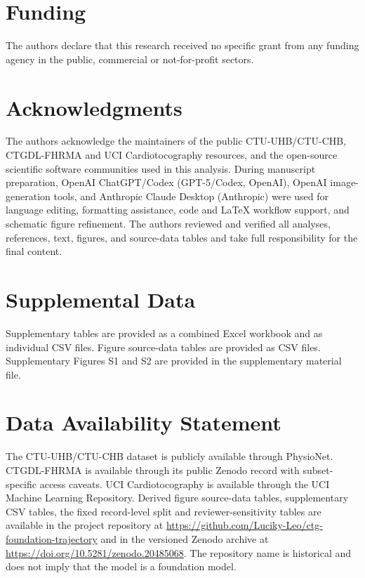 \documentclass[utf8]{FrontiersinHarvard}
\begin{document}
        \section*{Funding}
        The authors declare that this research received no specific grant from any funding agency in the public, commercial or not-for-profit sectors.

        \section*{Acknowledgments}
        The authors acknowledge the maintainers of the public CTU-UHB/CTU-CHB, CTGDL-FHRMA and UCI Cardiotocography resources, and the open-source scientific software communities used in this analysis. During manuscript preparation, OpenAI ChatGPT/Codex (GPT-5/Codex, OpenAI), OpenAI image-generation tools, and Anthropic Claude Desktop (Anthropic) were used for language editing, formatting assistance, code and LaTeX workflow support, and schematic figure refinement. The authors reviewed and verified all analyses, references, text, figures, and source-data tables and take full responsibility for the final content.

        \section*{Supplemental Data}
        Supplementary tables are provided as a combined Excel workbook and as individual CSV files. Figure source-data tables are provided as CSV files. Supplementary Figures S1 and S2 are provided in the supplementary material file.

        \section*{Data Availability Statement}
        The CTU-UHB/CTU-CHB dataset is publicly available through PhysioNet. CTGDL-FHRMA is available through its public Zenodo record with subset-specific access caveats. UCI Cardiotocography is available through the UCI Machine Learning Repository. Derived figure source-data tables, supplementary CSV tables, the fixed record-level split and reviewer-sensitivity tables are available in the project repository at \url{https://github.com/Luciky-Leo/ctg-foundation-trajectory} and in the versioned Zenodo archive at \url{https://doi.org/10.5281/zenodo.20485068}. The repository name is historical and does not imply that the model is a foundation model.
\end{document}
